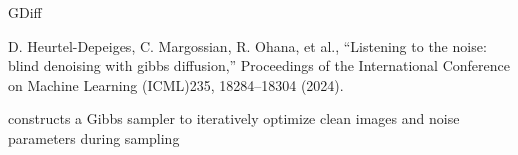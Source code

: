 GDiff

D. Heurtel-Depeiges, C. Margossian, R. Ohana, et al., “Listening to the noise: blind denoising with gibbs diffusion,” Proceedings of the International Conference on Machine Learning (ICML)235, 18284–18304 (2024).

 constructs a Gibbs sampler to iteratively optimize clean images and noise parameters during sampling
